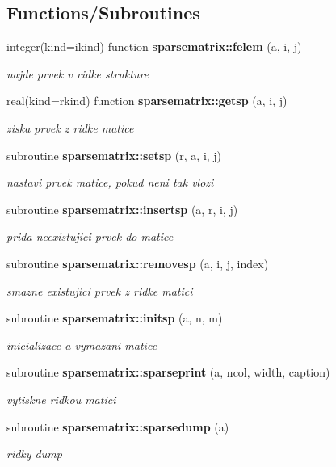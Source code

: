\subsection*{Functions/\+Subroutines}
\begin{DoxyCompactItemize}
\item 
integer(kind=ikind) function {\bf sparsematrix\+::felem} (a, i, j)
\begin{DoxyCompactList}\small\item\em najde prvek v ridke strukture \end{DoxyCompactList}\item 
real(kind=rkind) function {\bf sparsematrix\+::getsp} (a, i, j)
\begin{DoxyCompactList}\small\item\em ziska prvek z ridke matice \end{DoxyCompactList}\item 
subroutine {\bf sparsematrix\+::setsp} (r, a, i, j)
\begin{DoxyCompactList}\small\item\em nastavi prvek matice, pokud neni tak vlozi \end{DoxyCompactList}\item 
subroutine {\bf sparsematrix\+::insertsp} (a, r, i, j)
\begin{DoxyCompactList}\small\item\em prida neexistujici prvek do matice \end{DoxyCompactList}\item 
subroutine {\bf sparsematrix\+::removesp} (a, i, j, index)
\begin{DoxyCompactList}\small\item\em smazne existujici prvek z ridke matici \end{DoxyCompactList}\item 
subroutine {\bf sparsematrix\+::initsp} (a, n, m)
\begin{DoxyCompactList}\small\item\em inicializace a vymazani matice \end{DoxyCompactList}\item 
subroutine {\bf sparsematrix\+::sparseprint} (a, ncol, width, caption)
\begin{DoxyCompactList}\small\item\em vytiskne ridkou matici \end{DoxyCompactList}\item 
subroutine {\bf sparsematrix\+::sparsedump} (a)
\begin{DoxyCompactList}\small\item\em ridky dump \end{DoxyCompactList}\item 

\end{DoxyCompactItemize}

